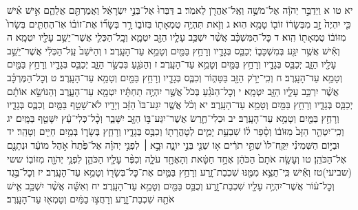 \documentclass[twoside, openany, parskip=half, 11pt]{book}
\begin{document}
יא טו א וַיְדַבֵּ֣ר יְהֹוָ֔ה אֶל־מֹשֶׁ֥ה וְאֶֽל־אַהֲרֹ֖ן לֵאמֹֽר׃ ב דַּבְּרוּ֙ אֶל־בְּנֵ֣י יִשְׂרָאֵ֔ל וַאֲמַרְתֶּ֖ם אֲלֵהֶ֑ם אִ֣ישׁ אִ֗ישׁ כִּ֤י יִהְיֶה֙ זָ֣ב מִבְּשָׂר֔וֹ זוֹב֖וֹ טָמֵ֥א הֽוּא׃ ג וְזֹ֛את תִּהְיֶ֥ה טֻמְאָת֖וֹ בְּזוֹב֑וֹ רָ֣ר בְּשָׂר֞וֹ אֶת־זוֹב֗וֹ אֽוֹ־הֶחְתִּ֤ים בְּשָׂרוֹ֙ מִזּוֹב֔וֹ טֻמְאָת֖וֹ הִֽוא׃ ד כׇּל־הַמִּשְׁכָּ֗ב אֲשֶׁ֨ר יִשְׁכַּ֥ב עָלָ֛יו הַזָּ֖ב יִטְמָ֑א וְכׇֽל־הַכְּלִ֛י אֲשֶׁר־יֵשֵׁ֥ב עָלָ֖יו יִטְמָֽא׃ ה וְאִ֕ישׁ אֲשֶׁ֥ר יִגַּ֖ע בְּמִשְׁכָּב֑וֹ יְכַבֵּ֧ס בְּגָדָ֛יו וְרָחַ֥ץ בַּמַּ֖יִם וְטָמֵ֥א עַד־הָעָֽרֶב׃ ו וְהַיֹּשֵׁב֙ עַֽל־הַכְּלִ֔י אֲשֶׁר־יֵשֵׁ֥ב עָלָ֖יו הַזָּ֑ב יְכַבֵּ֧ס בְּגָדָ֛יו וְרָחַ֥ץ בַּמַּ֖יִם וְטָמֵ֥א עַד־הָעָֽרֶב׃ ז וְהַנֹּגֵ֖עַ בִּבְשַׂ֣ר הַזָּ֑ב יְכַבֵּ֧ס בְּגָדָ֛יו וְרָחַ֥ץ בַּמַּ֖יִם וְטָמֵ֥א עַד־הָעָֽרֶב׃ ח וְכִֽי־יָרֹ֥ק הַזָּ֖ב בַּטָּה֑וֹר וְכִבֶּ֧ס בְּגָדָ֛יו וְרָחַ֥ץ בַּמַּ֖יִם וְטָמֵ֥א עַד־הָעָֽרֶב׃ ט וְכׇל־הַמֶּרְכָּ֗ב אֲשֶׁ֨ר יִרְכַּ֥ב עָלָ֛יו הַזָּ֖ב יִטְמָֽא׃ י וְכׇל־הַנֹּגֵ֗עַ בְּכֹל֙ אֲשֶׁ֣ר יִהְיֶ֣ה תַחְתָּ֔יו יִטְמָ֖א עַד־הָעָ֑רֶב וְהַנּוֹשֵׂ֣א אוֹתָ֔ם יְכַבֵּ֧ס בְּגָדָ֛יו וְרָחַ֥ץ בַּמַּ֖יִם וְטָמֵ֥א עַד־הָעָֽרֶב׃ יא וְכֹ֨ל אֲשֶׁ֤ר יִגַּע־בּוֹ֙ הַזָּ֔ב וְיָדָ֖יו לֹא־שָׁטַ֣ף בַּמָּ֑יִם וְכִבֶּ֧ס בְּגָדָ֛יו וְרָחַ֥ץ בַּמַּ֖יִם וְטָמֵ֥א עַד־הָעָֽרֶב׃ יב וּכְלִי־חֶ֛רֶשׂ אֲשֶׁר־יִגַּע־בּ֥וֹ הַזָּ֖ב יִשָּׁבֵ֑ר וְכׇ֨ל־כְּלִי־עֵ֔ץ יִשָּׁטֵ֖ף בַּמָּֽיִם׃ יג וְכִֽי־יִטְהַ֤ר הַזָּב֙ מִזּוֹב֔וֹ וְסָ֨פַר ל֜וֹ שִׁבְעַ֥ת יָמִ֛ים לְטׇהֳרָת֖וֹ וְכִבֶּ֣ס בְּגָדָ֑יו וְרָחַ֧ץ בְּשָׂר֛וֹ בְּמַ֥יִם חַיִּ֖ים וְטָהֵֽר׃ יד וּבַיּ֣וֹם הַשְּׁמִינִ֗י יִֽקַּֽח־לוֹ֙ שְׁתֵּ֣י תֹרִ֔ים א֥וֹ שְׁנֵ֖י בְּנֵ֣י יוֹנָ֑ה וּבָ֣א ׀ לִפְנֵ֣י יְהֹוָ֗ה אֶל־פֶּ֙תַח֙ אֹ֣הֶל מוֹעֵ֔ד וּנְתָנָ֖ם אֶל־הַכֹּהֵֽן׃ טו וְעָשָׂ֤ה אֹתָם֙ הַכֹּהֵ֔ן אֶחָ֣ד חַטָּ֔את וְהָאֶחָ֖ד עֹלָ֑ה וְכִפֶּ֨ר עָלָ֧יו הַכֹּהֵ֛ן לִפְנֵ֥י יְהֹוָ֖ה מִזּוֹבֽוֹ׃
ששי (שביעי)טז וְאִ֕ישׁ כִּֽי־תֵצֵ֥א מִמֶּ֖נּוּ שִׁכְבַת־זָ֑רַע וְרָחַ֥ץ בַּמַּ֛יִם אֶת־כׇּל־בְּשָׂר֖וֹ וְטָמֵ֥א עַד־הָעָֽרֶב׃ יז וְכׇל־בֶּ֣גֶד וְכׇל־ע֔וֹר אֲשֶׁר־יִהְיֶ֥ה עָלָ֖יו שִׁכְבַת־זָ֑רַע וְכֻבַּ֥ס בַּמַּ֖יִם וְטָמֵ֥א עַד־הָעָֽרֶב׃ יח וְאִשָּׁ֕ה אֲשֶׁ֨ר יִשְׁכַּ֥ב אִ֛ישׁ אֹתָ֖הּ שִׁכְבַת־זָ֑רַע וְרָחֲצ֣וּ בַמַּ֔יִם וְטָמְא֖וּ עַד־הָעָֽרֶב׃
\end{document}
